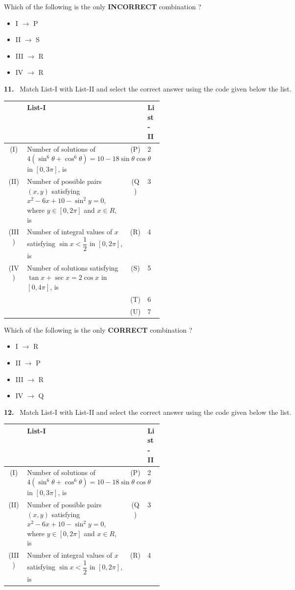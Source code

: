\documentclass[10pt]{extarticle}
\newcommand{\qn}[1]{\par\smallskip\noindent\textbf{#1.}~}
\newenvironment{qoptions}{\begin{itemize}[leftmargin=1.8em,itemsep=1pt,topsep=2pt,label={}]}{\end{itemize}}
\newcommand{\opt}[2]{\item[(#1)] #2}
\begin{document}
\begin{multicols}{2}
{\begin{tabular}{|c|p{0.3\linewidth}|c|p{0.3\linewidth}|}
\end{tabular}}\par
Which of the following is the only \textbf{INCORRECT} combination ?
\begin{qoptions}
\opt{A}{I $\to$ P}
\opt{B}{II $\to$ S}
\opt{C}{III $\to$ R}
\opt{D}{IV $\to$ R}
\end{qoptions}
\qn{11} Match List-I with List-II and select the correct answer using the code given below the list.\par
{\footnotesize\setlength{\tabcolsep}{2pt}\begin{tabular}{|c|p{0.27\linewidth}|c|p{0.1\linewidth}|}
\hline
 & \centering\textbf{List-I} & & \textbf{List-II}\\ \hline
(I) & Number of solutions of $4(\sin^6\theta+\cos^6\theta)=10-18\sin\theta\cos\theta$ in $[0,3\pi]$, is & (P) & 2\\ \hline
(II) & Number of possible pairs $(x,y)$ satisfying $x^2-6x+10-\sin^2y=0$, where $y\in[0,2\pi]$ and $x\in R$, is & (Q) & 3\\ \hline
(III) & Number of integral values of $x$ satisfying $\sin x<\dfrac12$ in $[0,2\pi]$, is & (R) & 4\\ \hline
(IV) & Number of solutions satisfying $\tan x+\sec x=2\cos x$ in $[0,4\pi]$, is & (S) & 5\\ \hline
 & & (T) & 6\\ \hline
 & & (U) & 7\\ \hline
\end{tabular}}\par
Which of the following is the only \textbf{CORRECT} combination ?
\begin{qoptions}
\opt{A}{I $\to$ R}
\opt{B}{II $\to$ P}
\opt{C}{III $\to$ R}
\opt{D}{IV $\to$ Q}
\end{qoptions}
\qn{12} Match List-I with List-II and select the correct answer using the code given below the list.\par
{\footnotesize\setlength{\tabcolsep}{2pt}\begin{tabular}{|c|p{0.27\linewidth}|c|p{0.1\linewidth}|}
\hline
 & \centering\textbf{List-I} & & \textbf{List-II}\\ \hline
(I) & Number of solutions of $4(\sin^6\theta+\cos^6\theta)=10-18\sin\theta\cos\theta$ in $[0,3\pi]$, is & (P) & 2\\ \hline
(II) & Number of possible pairs $(x,y)$ satisfying $x^2-6x+10-\sin^2y=0$, where $y\in[0,2\pi]$ and $x\in R$, is & (Q) & 3\\ \hline
(III) & Number of integral values of $x$ satisfying $\sin x<\dfrac12$ in $[0,2\pi]$, is & (R) & 4\\ \hline

\end{tabular}}
\end{multicols}
\end{document}
